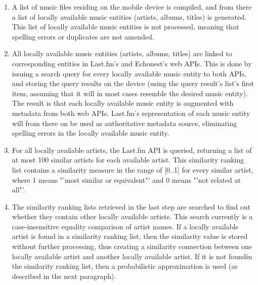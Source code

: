\begin{enumerate}
	\item A list of music files residing on the mobile device is compiled, and from there a list of locally available music entities (artists, albums, titles) is generated. This list of locally available music entities is not processed, meaning that spelling errors or duplicates are not amended.
	\item All locally available music entities (artists, albums, titles) are linked to corresponding entities in Last.fm's and Echonest's web APIs. This is done by issuing a search query for every locally available music entity to both APIs, and storing the query results on the device (using the query result's list's first item, assuming that it will in most cases resemble the desired music entity). The result is that each locally available music entity is augmented with metadata from both web APIs. Last.fm's representation of each music entity will from there on be used as authoritative metadata source, eliminating spelling errors in the locally available music entity.
	\item For all locally available artists, the Last.fm API is queried, returning a list of at most 100 similar artists for each available artist. This similarity ranking list contains a similarity measure in the range of [0..1] for every similar artist, where 1 means "'most similar or equivalent"' and 0 means "'not related at all"'.
	\item The similarity ranking lists retrieved in the last step are searched to find out whether they contain other locally available artists. This search currently is a case-insensitive equality comparison of artist names. If a locally available artist is found in a similarity ranking list, then the similarity value is stored without further processing, thus creating a similarity connection between one locally available artist and another locally available artist. If it is not foundin the similarity ranking list, then a probabilistic approximation is used (as described in the next paragraph).
\end{enumerate}

